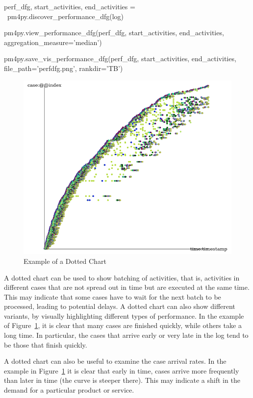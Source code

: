 \begin{samepage}
\begin{pythoncode}
perf_dfg, start_activities, end_activities = \
    pm4py.discover_performance_dfg(log)
    
pm4py.view_performance_dfg(perf_dfg, 
    start_activities, end_activities, 
    aggregation_measure='median')
    
pm4py.save_vis_performance_dfg(perf_dfg, 
    start_activities, end_activities, 
    file_path='perfdfg.png', rankdir='TB')
\end{pythoncode}
\end{samepage}

\begin{figure}
\centering
\includegraphics[width=.8\textwidth]{dottedchart.png}
\caption{Example of a Dotted Chart}
\label{fig:dotted_chart}
\end{figure}

A dotted chart can be used to show batching of activities, that is, activities in different cases that are not spread out in time but are executed at the same time. This may indicate that some cases have to wait for the next batch to be processed, leading to potential delays. A dotted chart can also show different variants, by visually highlighting different types of performance. In the example of Figure~\ref{fig:dotted_chart}, it is clear that many cases are finished quickly, while others take a long time. In particular, the cases that arrive early or very late in the log tend to be those that finish quickly. 

A dotted chart can also be useful to examine the case arrival rates. In the example in Figure~\ref{fig:dotted_chart} it is clear that early in time, cases arrive more frequently than later in time (the curve is steeper there). This may indicate a shift in the demand for a particular product or service. 

